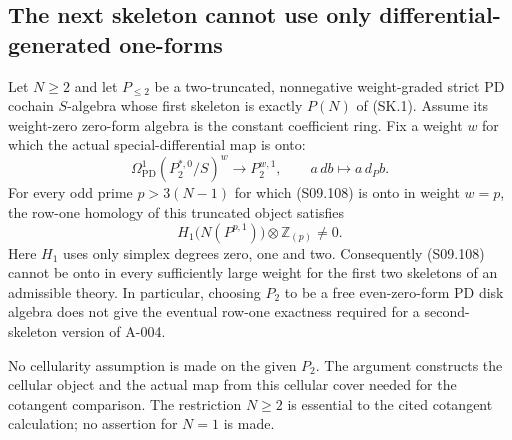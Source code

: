 \subsection{The next skeleton cannot use only differential-generated one-forms}

\begin{proposition}
\label{AS0923}
Let $N\geq2$ and let $P_{\leq2}$ be a two-truncated,
nonnegative weight-graded strict PD cochain $S$-algebra
whose first skeleton is exactly $P(N)$ of (SK.1).
Assume its weight-zero zero-form algebra is the constant
coefficient ring.  Fix a weight $w$ for which the actual
special-differential map is onto:
\[
 \Omega^1_{\mathrm{PD}}(P_2^{*,0}/S)^w
                  \longrightarrow P_2^{w,1},
                  \qquad a\,db\longmapsto a\,d_Pb.
 \tag{S09.108}
\]
For every odd prime $p>3(N-1)$ for which (S09.108) is
onto in weight $w=p$, the row-one homology of this
truncated object satisfies
\[
                 H_1\bigl(N(P^{p,1})\bigr)
                         \otimes\mathbb Z_{(p)}\ne0.
 \tag{S09.109}
\]
Here $H_1$ uses only simplex degrees zero, one and two.
Consequently (S09.108) cannot be onto in every sufficiently
large weight for the first two skeletons of an admissible
theory.  In particular, choosing $P_2$ to be a free
even-zero-form PD disk algebra does not give the eventual
row-one exactness required for a second-skeleton version
of A-004.

No cellularity assumption is made on the given $P_2$.
The argument constructs the cellular object and the
actual map from this cellular cover needed for the cotangent comparison.
The restriction $N\geq2$ is essential to the cited
cotangent calculation; no assertion for $N=1$ is made.
\end{proposition}

